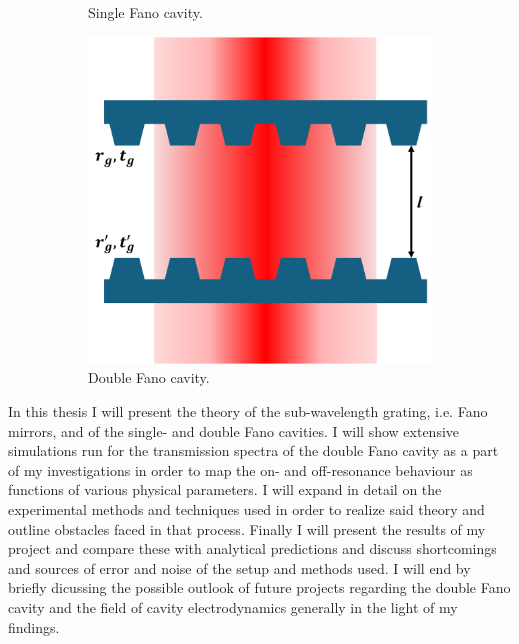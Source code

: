 \begin{figure}[h!]
\begin{subfigure}[b]{0.3\textwidth}
        \caption{Single Fano cavity.}
        \label{fig:single_fano_cavity_sketch}
    \end{subfigure}
    \hfill
    \begin{subfigure}[b]{0.3\textwidth}
        \includegraphics[width=\textwidth]{figures/double_fano_sketch.pdf}
        \caption{Double Fano cavity.}
        \label{fig:double_fano_cavity_sketch}
    \end{subfigure}
    \caption{}
    \label{fig:all_cavities_sketch}
\end{figure}

In this thesis I will present the theory of the sub-wavelength grating, i.e. Fano mirrors, and of the single- and double Fano cavities. I will show extensive simulations run for the transmission spectra of the double Fano cavity as a part of my investigations in order to map the on- and off-resonance behaviour as functions of various physical parameters. I will expand in detail on the experimental methods and techniques used in order to realize said theory and outline obstacles faced in that process. Finally I will present the results of my project and compare these with analytical predictions and discuss shortcomings and sources of error and noise of the setup and methods used. I will end by briefly dicussing the possible outlook of future projects regarding the double Fano cavity and the field of cavity electrodynamics generally in the light of my findings. 